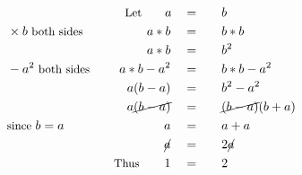\begin{alignat*}{5}
&\,&\small\text{Let}\qquad a\quad&=\quad&&b\\
&\times b\small\text{ both sides}\quad&a*b\quad&=&&b*b\\
&\,&a*b\quad&=&&b^2\\
&-a^2\small\text{ both sides}\quad&a*b-a^2\quad&=&&b*b-a^2\\
&\,&a(b-a)\quad&=&&b^2-a^2\\
&\,&a\cancel{(b-a)}\quad&=&&\cancel{(b-a)}(b+a)\\
&\small\text{since }b=a&a\quad&=&&a+a\\
&\,&\cancel{a}\quad&=&&2\cancel{a}\\
&\,&\small\text{Thus}\normalsize\qquad1\quad&=&&2
\end{alignat*}
